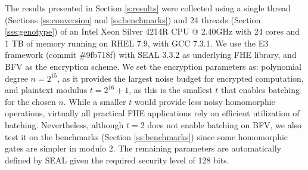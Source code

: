 The results presented in Section \ref{s:results} were collected using a single thread (Sections \ref{ss:conversion} and \ref{ss:benchmarks}) and 24 threads (Section \ref{sss:genotype}) of an Intel Xeon Silver 4214R CPU @ 2.40GHz with 24 cores and 1 TB of memory running on RHEL 7.9, with GCC 7.3.1. We use the E3 framework (commit \#9fb718f) with SEAL 3.3.2 \cite{seal} as underlying FHE library, and BFV as the encryption scheme. We set the encryption parameters as: polynomial degree $n = 2^{15}$, as it provides the largest noise budget for encrypted computation, and plaintext modulus $t = 2^{16}+1$, as this is the smallest $t$ that enables batching for the chosen $n$. While a smaller $t$ would provide less noisy homomorphic operations, virtually all practical FHE applications rely on efficient utilization of batching. Nevertheless, although $t=2$ does not enable batching on BFV, we also test it on the benchmarks (Section \ref{ss:benchmarks}) since some homomorphic gates are simpler in modulo 2. The remaining parameters are automatically defined by SEAL given the required security level of 128 bits.